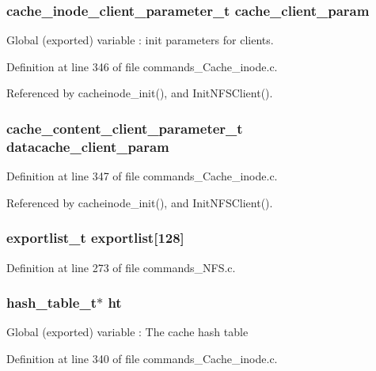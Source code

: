 \subsubsection{\setlength{\rightskip}{0pt plus 5cm}cache\_\-inode\_\-client\_\-parameter\_\-t {\bf cache\_\-client\_\-param}}\label{commands__NFS_8c_a5}


Global (exported) variable : init parameters for clients. 

Definition at line 346 of file commands\_\-Cache\_\-inode.c.

Referenced by cacheinode\_\-init(), and Init\-NFSClient().
\subsubsection{\setlength{\rightskip}{0pt plus 5cm}cache\_\-content\_\-client\_\-parameter\_\-t {\bf datacache\_\-client\_\-param}}\label{commands__NFS_8c_a6}




Definition at line 347 of file commands\_\-Cache\_\-inode.c.

Referenced by cacheinode\_\-init(), and Init\-NFSClient().
\subsubsection{\setlength{\rightskip}{0pt plus 5cm}exportlist\_\-t {\bf exportlist}[128]}\label{commands__NFS_8c_a8}




Definition at line 273 of file commands\_\-NFS.c.
\subsubsection{\setlength{\rightskip}{0pt plus 5cm}hash\_\-table\_\-t$\ast$ {\bf ht}}\label{commands__NFS_8c_a4}


Global (exported) variable : The cache hash table 

Definition at line 340 of file commands\_\-Cache\_\-inode.c.

